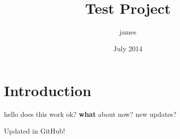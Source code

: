 \documentclass{article}
\title{Test Project}
\author{james }
\date{July 2014}
\begin{document}
\maketitle

\section{Introduction}

hello does this work ok? \textbf{what} about now? new updates?

Updated in GitHub!
\end{document}
